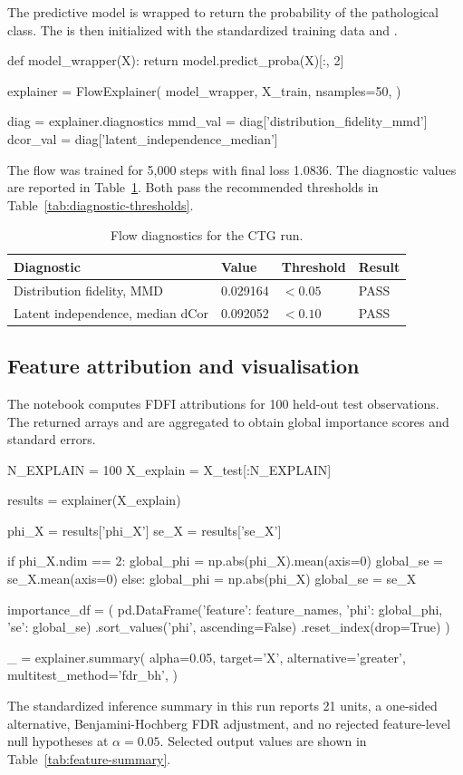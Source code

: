 The predictive model is wrapped to return the probability of the pathological
class. The  is then initialized with the standardized
training data and .
%
\begin{Code}
def model_wrapper(X):
    return model.predict_proba(X)[:, 2]

explainer = FlowExplainer(
    model_wrapper,
    X_train,
    nsamples=50,
)

diag = explainer.diagnostics
mmd_val = diag['distribution_fidelity_mmd']
dcor_val = diag['latent_independence_median']
\end{Code}
%
The flow was trained for 5,000 steps with final loss 1.0836. The diagnostic
values are reported in Table~\ref{tab:ctg-diagnostics}. Both pass the
recommended thresholds in Table~\ref{tab:diagnostic-thresholds}.

\begin{table}[t!]
\centering
\begin{tabular}{llll}
\hline
Diagnostic & Value & Threshold & Result \\ \hline
Distribution fidelity, MMD & 0.029164 & $<0.05$ & PASS \\
Latent independence, median dCor & 0.092052 & $<0.10$ & PASS \\ \hline
\end{tabular}
\caption{\label{tab:ctg-diagnostics} Flow diagnostics for the CTG run.}
\end{table}

\subsection{Feature attribution and visualisation}

The notebook computes FDFI attributions for 100 held-out test observations.
The returned arrays  and  are aggregated to obtain
global importance scores and standard errors.
%
\begin{Code}
N_EXPLAIN = 100
X_explain = X_test[:N_EXPLAIN]

results = explainer(X_explain)

phi_X = results['phi_X']
se_X = results['se_X']

if phi_X.ndim == 2:
    global_phi = np.abs(phi_X).mean(axis=0)
    global_se = se_X.mean(axis=0)
else:
    global_phi = np.abs(phi_X)
    global_se = se_X

importance_df = (
    pd.DataFrame({'feature': feature_names, 'phi': global_phi, 'se': global_se})
    .sort_values('phi', ascending=False)
    .reset_index(drop=True)
)

_ = explainer.summary(
    alpha=0.05,
    target='X',
    alternative='greater',
    multitest_method='fdr_bh',
)
\end{Code}
%
The standardized inference summary in this run reports 21 units, a one-sided
alternative, Benjamini-Hochberg FDR adjustment, and no rejected feature-level
null hypotheses at $\alpha = 0.05$. Selected output values are shown in
Table~\ref{tab:feature-summary}.

